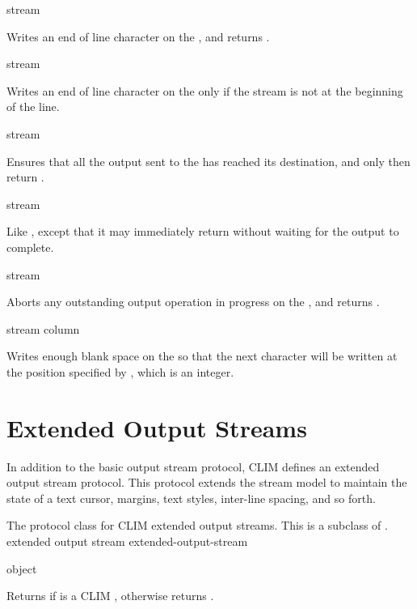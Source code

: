  {stream}

Writes an end of line character on the  , and
returns .

 {stream}

Writes an end of line character on the   only if
the stream is not at the beginning of the line.

 {stream}

Ensures that all the output sent to the   has
reached its destination, and only then return .

 {stream}

Like , except that it may immediately return
 without waiting for the output to complete.

 {stream}

Aborts any outstanding output operation in progress on the 
, and returns .

 {stream column}

Writes enough blank space on the   so that the
next character will be written at the position specified by , which
is an integer.


\section {Extended Output Streams}

In addition to the basic output stream protocol, CLIM defines an extended output
stream protocol.  This protocol extends the stream model to maintain the state
of a text cursor, margins, text styles, inter-line spacing, and so forth.


The protocol class for CLIM extended output streams.  This is a subclass of
.
 {extended output stream} {extended-output-stream}

 {object}

Returns  if  is a CLIM ,
otherwise returns .


